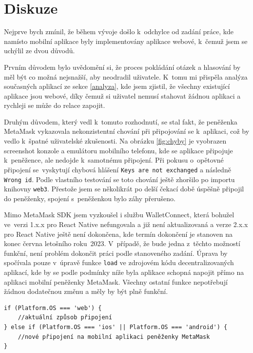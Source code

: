 \section{Diskuze}
Nejprve bych zmínil, že během vývoje došlo k~odchylce od zadání práce, kde namísto mobilní aplikace byly implementovány aplikace webové, k~čemuž jsem se uchýlil ze dvou důvodů. 

Prvním důvodem bylo uvědomění si, že proces pokládání otázek a hlasování by měl být co možná nejsnažší, aby neodradil uživatele. K~tomu mi přispěla analýza současných aplikací ze sekce \ref{analyza}, kde jsem zjistil, že všechny existující aplikace jsou webové, díky čemuž si uživatel nemusí stahovat žádnou aplikaci a rychleji se může do relace zapojit. 

Druhým důvodem, který vedl k~tomuto rozhodnutí, se stal fakt, že peněženka MetaMask vykazovala nekonzistentní chování při připojování se k~aplikaci, což by vedlo k~špatné uživatelské zkušenosti. Na obrázku \ref{fig:chyby} je vyobrazen screenshot konzole a emulátoru mobilního telefonu, kde se aplikace připojuje k~peněžence, ale nedojde k~samotnému připojení. Při pokusu o~opětovné připojení se~vyskytují chybová hlášení \texttt{Keys are not exchanged} a následně \texttt{Wrong id}. Podle vlastního testování se toto chování ještě zhoršilo po importu knihovny \texttt{web3}. Přestože jsem se několikrát po delší čekací době úspěšně připojil do peněženky, spojení s~peněženkou bylo záhy přerušeno. 

Mimo MetaMask SDK jsem vyzkoušel i službu WalletConnect, která bohužel ve~verzi 1.x.x pro React Native nefungovala a již není aktualizovaná a verze 2.x.x pro React Native ještě není dokončena, kde termín dokončení je stanoven na konec června letošního roku~2023. V~případě, že bude jedna z~těchto možností funkční, není problém dokončit práci podle stanoveného zadání. Úprava by spočívala pouze v~úpravě funkce \texttt{load} ve zdrojovém kódu decentralizovaných aplikací, kde by se podle podmínky níže byla aplikace schopná napojit přímo na aplikaci mobilní peněženky MetaMask. Všechny ostatní funkce nepotřebují žádnou dodatečnou změnu a měly by být plně funkční.

\begin{verbatim}
if (Platform.OS === 'web') {
    //aktuální způsob připojení
} else if (Platform.OS === 'ios' || Platform.OS === 'android') {
    //nové připojení na mobilní aplikaci peněženky MetaMask
}
\end{verbatim}

